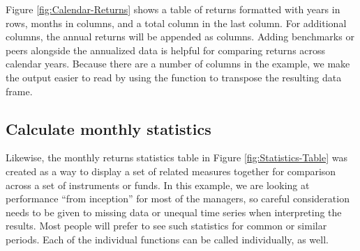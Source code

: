 \documentclass[12pt,letterpaper,english]{article}
\begin{document}
Figure \ref{fig:Calendar-Returns} shows a table of returns formatted
with years in rows, months in columns, and a total column in the last
column. For additional columns, the annual returns will be appended
as columns. Adding benchmarks or peers alongside the annualized data
is helpful for comparing returns across calendar years. Because there
are a number of columns in the example, we make the output easier
to read by using the  function to transpose the resulting
data frame.


\subsection{Calculate monthly statistics}

Likewise, the monthly returns statistics table in Figure \ref{fig:Statistics-Table}
was created as a way to display a set of related measures together
for comparison across a set of instruments or funds. In this example,
we are looking at performance {}``from inception'' for most of the
managers, so careful consideration needs to be given to missing data
or unequal time series when interpreting the results. Most people
will prefer to see such statistics for common or similar periods.
Each of the individual functions can be called individually, as well.
\end{document}
